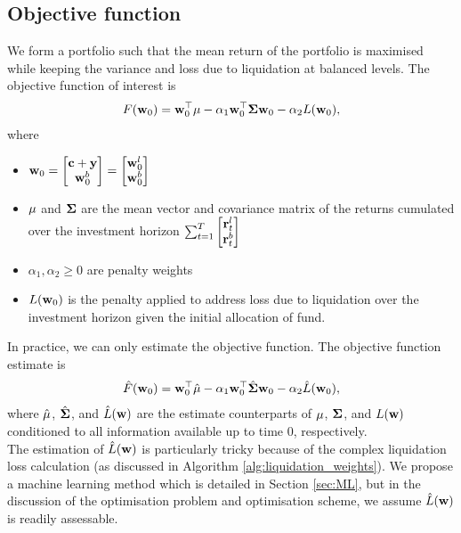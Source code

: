 \documentclass{article} %
\theoremstyle{plain}
\theoremstyle{definition} %
\begin{document}
\subsection{Objective function}
We form a portfolio such that the mean return of the portfolio is maximised while keeping the variance and loss due to liquidation at balanced levels.
 The objective function of interest is
 \begin{align}
  F({\bf w}_0) = {\bf w}^\top_0 {\bf \mu} - \alpha_1 {\bf w}^\top_0 {\bf \Sigma}{\bf w}_0 - \alpha_2 L({\bf w}_0),
 \end{align}
 where 
 \begin{itemize}
 \item ${\bf w}_0 = \begin{bmatrix} 
  {\bf c} + {\bf y} \\  {\bf w}^b_0 \end{bmatrix} = \begin{bmatrix} 
  {\bf w}^l_0 \\  {\bf w}^b_0 \end{bmatrix}$
  \item  ${\bf \mu}$ and ${\bf \Sigma}$ are the mean vector and covariance matrix of the returns cumulated over the investment horizon
  $\sum_{t=1}^T \begin{bmatrix}
    {\bf r}^l_t \\ {\bf r}^b_t
    \end{bmatrix}$
  \item $\alpha_1 , \alpha_2 \geq 0$ are penalty weights
  \item $L({\bf w}_0)$ is the penalty applied to address loss due to liquidation over the investment horizon given the initial allocation of fund. 
 \end{itemize}

In practice, we can only estimate the objective function. 
 The objective function estimate is 
 \begin{align}
  \hat F({\bf w}_0) = {\bf w}^\top_0 \hat {\bf \mu} - \alpha_1 {\bf w}^\top_0 \hat {\bf \Sigma}{\bf w}_0 - \alpha_2 \hat L({\bf w}_0),
 \end{align}
 where $\hat {\bf \mu}$, $\hat {\bf \Sigma}$, and $\hat L({\bf w})$ are the estimate counterparts of ${\bf \mu}$, ${\bf \Sigma}$, and $L({\bf w})$ conditioned to all information available up to time $0$, respectively. \\

The estimation of $\hat L({\bf w})$ is particularly tricky because of the complex liquidation loss calculation (as discussed in Algorithm \ref{alg:liquidation_weights}). 
 We propose a machine learning method which is detailed in Section \ref{sec:ML}, 
 but in the discussion of the optimisation problem and optimisation scheme, 
 we assume $\hat L({\bf w})$ is readily assessable. \\
\end{document}
